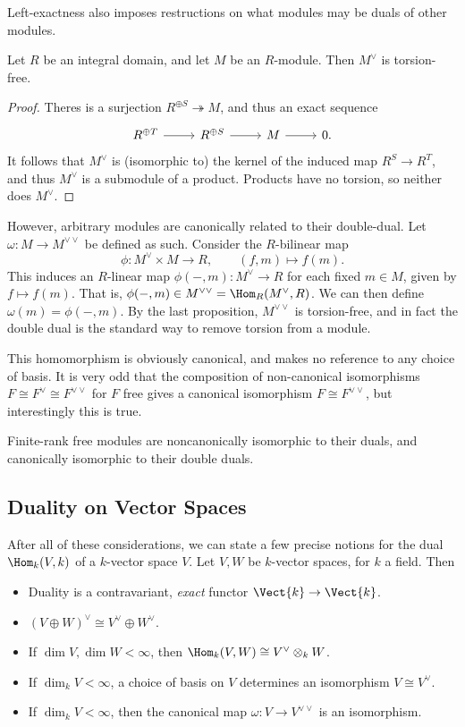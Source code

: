 Left-exactness also imposes restructions on what modules may be duals of other modules.
\begin{proposition}\label{prp:8.8}
	Let $R$ be an integral domain, and let $M$ be an $R$-module. Then $M^{\vee} $ is torsion-free.
\end{proposition}
\begin{proof}
	Theres is a surjection $R^{\oplus S} \twoheadrightarrow M$, and thus an exact sequence
	\[\begin{tikzcd}[row sep = 2.5em, column sep = 2.5em]
		R^{\oplus T} \arrow[r]&R^{\oplus S} \arrow[r]&M\arrow[r]&0.
	\end{tikzcd}\]
	It follows that $M^{\vee} $ is (isomorphic to) the kernel of the induced map $R^S\to R^T$, and thus $M^{\vee} $ is a submodule of a product. Products have no torsion, so neither does $M^{\vee} $.
\end{proof}

However, arbitrary modules are canonically related to their double-dual. Let $\omega : M \to M^{\vee\vee} $ be defined as such. Consider the $R$-bilinear map
\[
	\phi :M^{\vee} \times M\to R,\qquad (f,m)\mapsto f(m)
.\]
This induces an $R$-linear map $\phi (-,m):M^{\vee} \to R$ for each fixed $m\in M$, given by $f\mapsto f(m)$. That is, $\phi (-,m)\in M^{\vee\vee} =\Hom_{R}(M^{\vee} , R) $. We can then define $\omega (m)=\phi (-,m)$. By the last proposition, $M^{\vee\vee} $ is torsion-free, and in fact the double dual is the standard way to remove torsion from a module.

This homomorphism is obviously canonical, and makes no reference to any choice of basis. It is very odd that the composition of non-canonical isomorphisms $F\cong F^{\vee} \cong F^{\vee\vee} $ for $F$ free gives a canonical isomorphism $F\cong F^{\vee\vee} $, but interestingly this is true.
\begin{mdframed}[linewidth=1pt]
	Finite-rank free modules are noncanonically isomorphic to their duals, and canonically isomorphic to their double duals.
\end{mdframed}

\subsection{Duality on Vector Spaces}
After all of these considerations, we can state a few precise notions for the dual $\Hom_{k}(V, k) $ of a $k$-vector space $V$. Let $V,W$ be $k$-vector spaces, for $k$ a field. Then
\begin{itemize}
	\item Duality is a contravariant, \emph{exact} functor $\Vect{k} \to \Vect{k} $.
	\item $(V\oplus W)^{\vee} \cong V^{\vee} \oplus W^{\vee} $.
	\item If $\dim V,\dim W<\infty $, then $\Hom_{k}(V, W) \cong V^{\vee} \otimes_kW$.
	\item If $\dim_k V<\infty $, a choice of basis on $V$ determines an isomorphism $V\cong V^{\vee} $.
	\item If $\dim_kV<\infty $, then the canonical map $\omega : V \to V^{\vee\vee} $ is an isomorphism.
\end{itemize}
